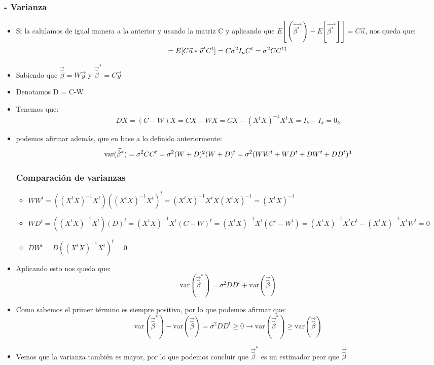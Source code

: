 \documentclass[a4paper,12pt]{article}
\newcommand{\betaEstimada}{\vec{\hat{\beta}}}
\newcommand{\ecuacion}[1]{\ensuremath{#1}}
\begin{document}
\begin{itemize}
    \subsubsection*{- Varianza}
    \begin{itemize}
        \item Si la calulamos de igual manera a la anterior y usando la matriz C y aplicando que $E[(\widehat{\beta^*}^t)- E[\widehat{\beta^*}^t]] = C\vec{u}$, nos queda que:
        \[
            = E[C\vec{u}*\vec{u}^tC^t] = C\sigma^2I_nC^t = \sigma^2CC^t \footnote{Hemos usado que \ecuacion{E[\vec{u}\vec{u}^t] = \sigma^2I_n}}
        \] 
        \item  Sabiendo que \ecuacion{\betaEstimada = W\vec{y}} y \ecuacion{\betaEstimada^* = C\vec{y}}
        \item Denotamos D = C-W
        \item Tenemos que:
        \[
            DX = (C-W)X = CX-WX = CX - (X^tX)^{-1}X^tX = I_k - I_k = 0_k
        \]
        \item podemos afirmar además, que en base a lo definido anteriormente:
        \[
            \text{var}(\betaEstimada^*) = \sigma^2CC^t = \sigma^2(W+D)\footnote{Usamos que \ecuacion{C = W+D}}(W+D)^t = \sigma^2(WW^t + WD^t + DW^t + DD^t)\footnote{De la anterior forma también es válida esta es más extensa, esta sirve para comparar las varianzas como vamos a ver a continuación}
        \]
        \subsubsection*{Comparación de varianzas}
        \begin{itemize}
            \item \ecuacion{WW^t = ((X^tX)^{-1}X^t)((X^tX)^{-1}X^t)^t = (X^tX)^{-1}X^tX(X^tX)^{-1} = (X^tX)^{-1}}
            \item \ecuacion{WD^t = ((X^tX)^{-1}X^t)(D)^t = (X^tX)^{-1}X^t(C-W)^t = (X^tX)^{-1}X^t(C^t-W^t) = (X^tX)^{-1}X^tC^t - (X^tX)^{-1}X^tW^t = 0}
            \item \ecuacion{DW^t = D((X^tX)^{-1}X^t)^t = 0}
        \end{itemize}
        \item Aplicando esto nos queda que:
        \[
            \ecuacion{\text{var}(\vec{\hat{\beta}}^*) = \sigma^2DD^t + \text{var}(\vec{\hat{\beta}})}
        \]
        \item Como sabemos el primer término es siempre positivo, por lo que podemos afirmar que:
        \[
            \ecuacion{\text{var}(\vec{\hat{\beta}}^*) - \text{var}(\vec{\hat{\beta}}) = \sigma^2DD^t \geq 0 \rightarrow \text{var}(\vec{\hat{\beta}}^*) \geq \text{var}(\vec{\hat{\beta}})}
        \]
        \item Vemos que la  varianza también es mayor, por lo que podemos concluir que \ecuacion{\vec{\hat{\beta}}^*} es un estimador peor que \ecuacion{\vec{\hat{\beta}}}
    \end{itemize}

\end{itemize}
\end{document}
